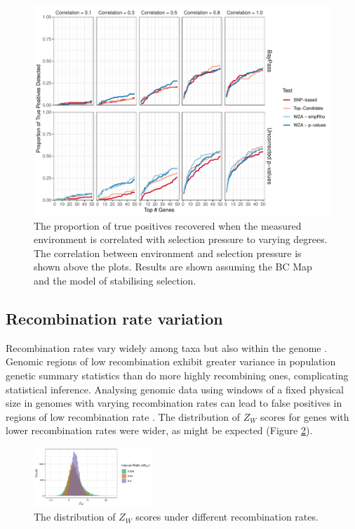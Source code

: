 \documentclass[10pt,twoside,lineno, twocolumn]{GSA_format}
\begin{document}
\begin{figure}
  \includegraphics[width=\linewidth]{Plots/correlatedEnvironments_BCmapResults.pdf} 
  \caption{The proportion of true positives recovered when the measured environment is correlated with selection pressure to varying degrees. The correlation between environment and selection pressure is shown above the plots. Results are shown assuming the BC Map and the model of stabilising selection.}

  \label{fig:truePosStabilising}
\end{figure}




\subsection{Recombination rate variation}

Recombination rates vary widely among taxa but also within the genome \citep{Stapley2017}. Genomic regions of low recombination exhibit greater variance in population genetic summary statistics than do more highly recombining ones, complicating statistical inference. Analysing genomic data using windows of a fixed physical size in genomes with varying recombination rates can lead to false positives in regions of low recombination rate \citep{Booker2020}. The distribution of $Z_W$ scores for genes with lower recombination rates were wider, as might be expected (Figure \ref{fig:WZA_Recombination}).

\begin{figure}[H]
  \includegraphics[width=0.4\textwidth]{Plots/recombinationRateHistogram.pdf} 
  \caption{The distribution of $Z_W$ scores under different recombination rates.}
  \label{fig:WZA_Recombination}
\end{figure}
\end{document}
